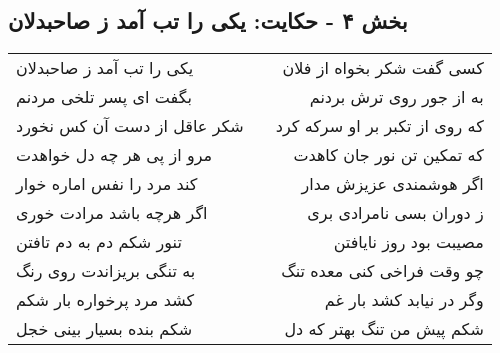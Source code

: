 \begin{center}
\section*{بخش ۴ - حکایت: یکی را تب آمد ز صاحبدلان}
\label{sec:004}
\begin{longtable}{l p{0.5cm} r}
یکی را تب آمد ز صاحبدلان
&&
کسی گفت شکر بخواه از فلان
\\
بگفت ای پسر تلخی مردنم
&&
به از جور روی ترش بردنم
\\
شکر عاقل از دست آن کس نخورد
&&
که روی از تکبر بر او سرکه کرد
\\
مرو از پی هر چه دل خواهدت
&&
که تمکین تن نور جان کاهدت
\\
کند مرد را نفس اماره خوار
&&
اگر هوشمندی عزیزش مدار
\\
اگر هرچه باشد مرادت خوری
&&
ز دوران بسی نامرادی بری
\\
تنور شکم دم به دم تافتن
&&
مصیبت بود روز نایافتن
\\
به تنگی بریزاندت روی رنگ
&&
چو وقت فراخی کنی معده تنگ
\\
کشد مرد پرخواره بار شکم
&&
وگر در نیابد کشد بار غم
\\
شکم بنده بسیار بینی خجل
&&
شکم پیش من تنگ بهتر که دل
\\
\end{longtable}
\end{center}
